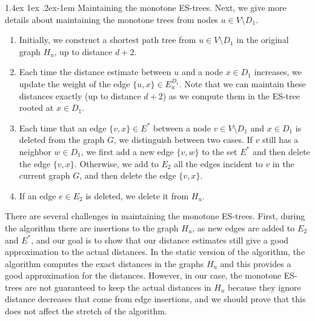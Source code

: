 \documentclass[11pt]{article}
\makeatletter
\theoremstyle{definition}
\theoremstyle{remark}
\newcommand{\ytodo}[1]{\todo[color=blue!20]{Y: #1}}
\newcommand{\sebastian}[1]{\todo[color=green!20]{S: #1}}
\renewcommand{\paragraph}{%
  \@startsection{paragraph}{4}%
  {\z@}{1.4ex \@plus 1ex \@minus .2ex}{-1em}%
  {\normalfont\normalsize\bfseries}%
}
\makeatother
\begin{document}
\paragraph{Maintaining the monotone ES-trees.}
Next, we give more details about maintaining the monotone trees from nodes $u \in V \setminus D_1$.
\begin{enumerate}
    \item Initially, we construct a shortest path tree from $u \in V \setminus D_1$ in the original graph $H_u$, up to distance $d+2$.
    \item Each time the distance estimate between $u$ and a node $x \in D_1$ increases, we update the weight of the edge $\{u,x\} \in E^{D_1}_u$. Note that we can maintain these distances exactly (up to distance $d+2$) as we compute them in the ES-tree rooted at $x \in D_1$.\label{step_dom}
    \item Each time that an edge $\{v,x\} \in E^*$ between a node $v \in V \setminus D_1$ and $x \in D_1$ is deleted from the graph $G$, we distinguish between two cases. If $v$ still has a neighbor $w \in D_1$, we first add a new edge $\{v,w\}$ to the set $E^*$ and then delete the edge $\{v,x\}$.%
    Otherwise, we add to $E_2$ all the edges incident to $v$ in the current graph $G$, and then delete the edge $\{v,x\}$.\label{step_E*_ES-tree}
    \item If an edge $e \in E_2$ is deleted, we delete it from $H_u$.
\end{enumerate}

There are several challenges in maintaining the monotone ES-trees. First, during the algorithm there are insertions to the graph $H_u$, as new edges are added to $E_2$ and $E^*$, and our goal is to show that our distance estimates still give a good approximation to the actual distances. In the static version of the algorithm, the algorithm computes the exact distances in the graphs $H_u$ and this provides a good approximation for the distances. However, in our case, the monotone ES-trees are not guaranteed to keep the actual distances in $H_u$ because they ignore distance decreases that come from edge insertions, and we should prove that this does not affect the stretch of the algorithm. 
\end{document}
